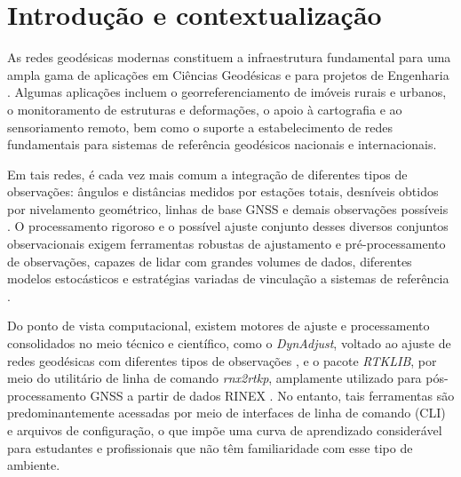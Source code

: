 \documentclass[
        12pt,                           %
        openright,                      %
        oneside,
        a4paper,                        %
        chapter=TITLE,         %
        section=TITLE,         %
        subsection=Title,      %
        english,                        %
        portugues,                      %
        ]{abntex2}
\begin{document}
\renewcommand{\bibname}{REFER\^ENCIAS}
\renewcommand{\tablename}{TABELA }
\renewcommand{\figurename}{FIGURA }
\renewcommand{\figureautorefname}{FIGURA}
\renewcommand{\tableautorefname}{TABELA}
\newcommand{\equationname}{equa\c{c}\~ao~}
\renewcommand{\equationautorefname}{equa\c{c}\~ao~}
\newcommand{\quadroautorefname}{QUADRO~}




\textual

\pagestyle{simplestextual}

\chapter{Introdução e contextualização}

As redes geodésicas modernas constituem a infraestrutura fundamental para uma ampla gama de aplicações em Ciências Geodésicas e para projetos de Engenharia \cite{Granemann2005_SaltoCaxias,wander_thesis,monico_gnss}. Algumas aplicações incluem o georreferenciamento de imóveis rurais e urbanos, o monitoramento de estruturas e deformações, o apoio à cartografia e ao sensoriamento remoto, bem como o suporte a estabelecimento de redes fundamentais para sistemas de referência geodésicos nacionais e internacionais.

Em tais redes, é cada vez mais comum a integração de diferentes tipos de observações: ângulos e distâncias medidos por estações totais, desníveis obtidos por nivelamento geométrico, linhas de base GNSS e demais observações possíveis \cite{Ghilani2010}. O processamento rigoroso e o possível ajuste conjunto desses diversos conjuntos observacionais exigem ferramentas robustas de ajustamento e pré-processamento de observações, capazes de lidar com grandes volumes de dados, diferentes modelos estocásticos e estratégias variadas de vinculação a sistemas de referência \cite{harrison_gda2020}.

Do ponto de vista computacional, existem motores de ajuste e processamento consolidados no meio técnico e científico, como o \textit{DynAdjust}, voltado ao ajuste de redes geodésicas com diferentes tipos de observações \cite{dynadjust_github,dynadjust_users_guide}, e o pacote \textit{RTKLIB}, por meio do utilitário de linha de comando \textit{rnx2rtkp}, amplamente utilizado para pós-processamento GNSS a partir de dados RINEX \cite{rtklib_manual,rtklib_explorer}. No entanto, tais ferramentas são predominantemente acessadas por meio de interfaces de linha de comando (CLI) e arquivos de configuração, o que impõe uma curva de aprendizado considerável para estudantes e profissionais que não têm familiaridade com esse tipo de ambiente.
\end{document}

